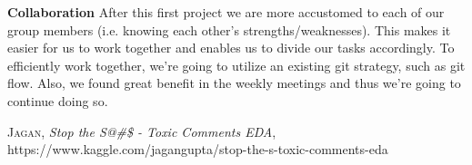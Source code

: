\documentclass[10pt, a4paper]{article}
\begin{document}
\begin{multicols}{2}
		\textbf{Collaboration} After this first project we are more accustomed to each of our group members (i.e. knowing each other's strengths/weaknesses). This makes it easier for us to work together and enables us to divide our tasks accordingly. To efficiently work together, we're going to utilize an existing git strategy, such as git flow. Also, we found great benefit in the weekly meetings and thus we're going to continue doing so.
		\begin{thebibliography}{xx}
			\textsc{Jagan}, \textit{Stop the S@\#\$ - Toxic Comments EDA},
			https://www.kaggle.com/jagangupta/stop-the-s-toxic-comments-eda
		\end{thebibliography}
		
		
	\end{multicols}
	
\end{document}
